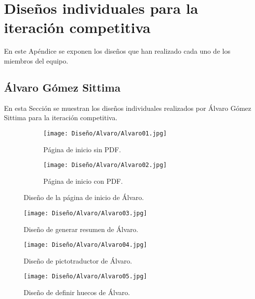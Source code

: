 \chapter{Diseños individuales para la iteración competitiva}
\label{ape:disenyosindividuales}

En este Apéndice se exponen los diseños que han realizado cada uno de los miembros del equipo.

\section{Álvaro Gómez Sittima}
\label{sec:disenyoAlvaro}
En esta Sección se muestran los diseños individuales realizados por Álvaro Gómez Sittima para la iteración competitiva.

\begin{figure}[ht!]
  \centering

  \begin{subfigure}{\textwidth}
    \centering
    \texttt{[image: Diseño/Alvaro/Alvaro01.jpg]}
    \caption{Página de inicio sin PDF.}
    \label{fig:disenyoAlvaro01a}
  \end{subfigure}

  \begin{subfigure}{\textwidth}
    \centering
    \texttt{[image: Diseño/Alvaro/Alvaro02.jpg]}
    \caption{Página de inicio con PDF.}
    \label{fig:disenyoAlvaro01b}
  \end{subfigure}

  \caption{Diseño de la página de inicio de Álvaro.}
  \label{fig:disenyoAlvaro01}
\end{figure}

\begin{figure}[ht!]
  \centering
  \texttt{[image: Diseño/Alvaro/Alvaro03.jpg]}
  \caption{Diseño de generar resumen de Álvaro.}
  \label{fig:disenyoAlvaro02}
\end{figure}

\begin{figure}[ht!]
  \centering
  \texttt{[image: Diseño/Alvaro/Alvaro04.jpg]}
  \caption{Diseño de pictotraductor de Álvaro.}
  \label{fig:disenyoAlvaro03}
\end{figure}

\begin{figure}[ht!]
  \centering
  \texttt{[image: Diseño/Alvaro/Alvaro05.jpg]}
  \caption{Diseño de definir huecos de Álvaro.}
  \label{fig:disenyoAlvaro04}
\end{figure}

